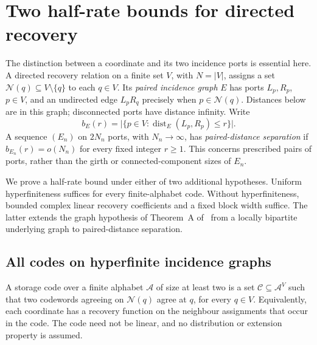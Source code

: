 \section{Two half-rate bounds for directed recovery}
\label{sec:dc-section}

The distinction between a coordinate and its two incidence ports is essential
here.  A directed recovery relation on a finite set $V$, with $N=|V|$, assigns
a set $\mathcal N(q)\subseteq V\setminus\{q\}$ to each $q\in V$.
Its \emph{paired incidence graph} $E$ has ports $L_p,R_p$, $p\in V$, and
an undirected edge $L_pR_q$ precisely when $p\in\mathcal N(q)$.
Distances below are in this graph; disconnected ports have distance infinity.
Write
\begin{equation}
  b_E(r)=\bigl|\{p\in V:\operatorname{dist}_E(L_p,R_p)\le r\}\bigr|.
  \label{eq:dc-bad-pairs}
\end{equation}
A sequence $(E_n)$ on $2N_n$ ports, with $N_n\to\infty$, has
\emph{paired-distance separation} if $b_{E_n}(r)=o(N_n)$ for every fixed
integer $r\ge1$.  This concerns prescribed pairs of ports, rather than
the girth or connected-component sizes of $E_n$.

We prove a half-rate bound under either of two additional hypotheses.
Uniform hyperfiniteness suffices for every finite-alphabet code.
Without hyperfiniteness, bounded complex linear recovery coefficients
and a fixed block width suffice.  The latter extends the graph hypothesis
of Theorem~A of~\cite{BrendeCurved} from a locally bipartite underlying
graph to paired-distance separation.

\subsection{All codes on hyperfinite incidence graphs}

A storage code over a finite alphabet $\mathcal A$ of size at least two is a set
$\mathcal C\subseteq\mathcal A^V$ such that two codewords agreeing on
$\mathcal N(q)$ agree at $q$, for every $q\in V$.
Equivalently, each coordinate has a recovery function on the neighbour
assignments that occur in the code.  The code need not be linear, and
no distribution or extension property is assumed.

